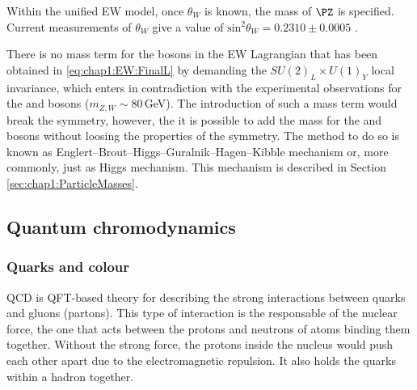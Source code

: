 Within the unified EW  model, once $ \theta_{W}$ is known, the mass of $\PZ$ is specified.
Current measurements of $ \theta_{W}$ give a value of $\textrm{sin}^{2} \theta_{W} = 0.2310 \pm 0.0005$ \cite{CMS:2018ktx}. 



There is no mass term for the bosons in the EW Lagrangian that has been obtained in \ref{eq:chap1:EW:FinalL} by demanding the $SU(2)_{L} \times U(1)_{Y}$ local invariance, 
which enters in contradiction with the experimental observations for the \PW and \PZ bosons ($m_{Z,W} \sim 80\,$GeV).  The introduction of such a mass term would break the symmetry, however, the 
it is possible to add the mass for the \PW and \PZ bosons without loosing the properties of the symmetry. The method to do so is known as Englert–Brout–Higgs–Guralnik–Hagen–Kibble mechanism
or, more commonly, just as Higgs mechanism. This mechanism is described in Section \ref{sec:chap1:ParticleMasses}.








\subsection{Quantum chromodynamics}
\label{sec:chap1:QCD}

\subsubsection{Quarks and colour}%
QCD is QFT-based theory for describing the strong interactions between quarks and gluons (partons). This type of interaction 
is the responsable   of the nuclear force, the one that acts between the protons and neutrons of atoms binding them together. Without the
strong force, the protons inside the nucleus would push each other apart due to the electromagnetic repulsion. It also holds the quarks within a hadron
together. 

